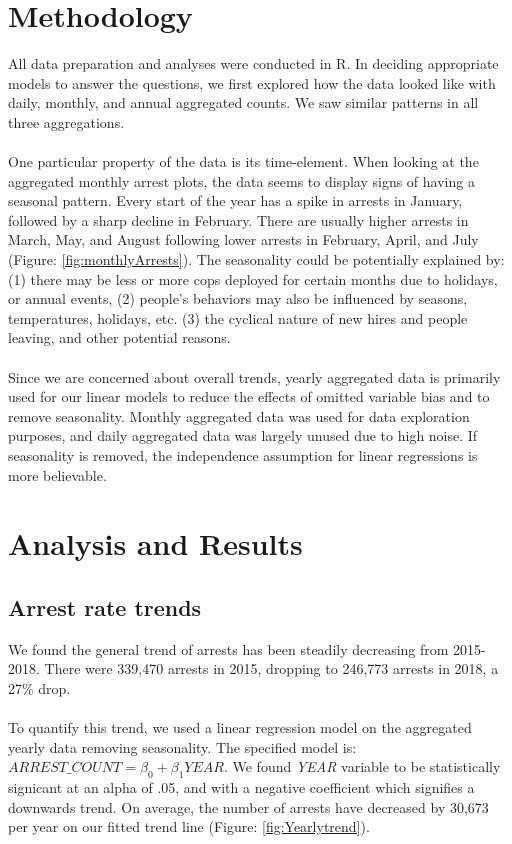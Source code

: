 \documentclass[11pt]{article}\usepackage[]{graphicx}\usepackage[]{color}
\begin{document}
\section{Methodology}
All data preparation and analyses were conducted in R. In deciding appropriate models to answer the questions, we first explored how the data looked like with daily, monthly, and annual aggregated counts. We saw similar patterns in all three aggregations.
\\\\
One particular property of the data is its time-element. When looking at the aggregated monthly arrest plots, the data seems to display signs of having a seasonal pattern. Every start of the year has a spike in arrests in January, followed by a sharp decline in February. There are usually higher arrests in March, May, and August following lower arrests in February, April, and July (Figure: \ref{fig:monthlyArrests}). The seasonality could be potentially explained by: (1) there may be less or more cops deployed for certain months due to holidays, or annual events, (2) people's behaviors may also be influenced by seasons, temperatures, holidays, etc. (3) the cyclical nature of new hires and people leaving, and other potential reasons. 
\\\\
Since we are concerned about overall trends, yearly aggregated data is primarily used for our linear models to reduce the effects of omitted variable bias and to remove seasonality. Monthly aggregated data was used for data exploration purposes, and daily aggregated data was largely unused due to high noise.  If seasonality is removed, the independence assumption for linear regressions is more believable.

\section{Analysis and Results}
\subsection{Arrest rate trends}
We found the general trend of arrests has been steadily decreasing from 2015-2018. There were 339,470 arrests in 2015, dropping to 246,773 arrests in 2018, a 27\% drop.
\\\\
To quantify this trend, we used a linear regression model on the aggregated yearly data removing seasonality. The specified model is: $ARREST\_COUNT=\beta_0+\beta_1YEAR$. We found \textit{YEAR} variable to be statistically signicant at an alpha of .05, and with a negative coefficient which signifies a downwards trend. On average, the number of arrests have decreased by 30,673 per year on our fitted trend line (Figure: \ref{fig:Yearlytrend}).
\end{document}
